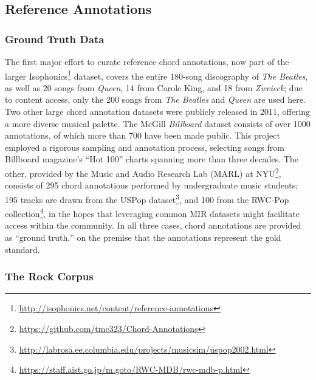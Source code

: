 \documentclass{article}
\begin{document}
\subsection{Reference Annotations}
\label{subsec:data}



\subsubsection{Ground Truth Data}
\label{subsubsec:ground_truth}

The first major effort to curate reference chord annotations, now part of the larger Isophonics\footnote{\url{http://isophonics.net/content/reference-annotations}} dataset, covers the entire 180-song discography of \emph{The Beatles}, as well as 20 songs from \emph{Queen}, 14 from Carole King, and 18 from \emph{Zweieck};
due to content access, only the 200 songs from \emph{The Beatles} and \emph{Queen} are used here.
Two other large chord annotation datasets were publicly released in 2011, offering a more diverse musical palette.
The McGill \emph{Billboard} dataset consists of over 1000 annotations, of which more than 700 have been made public.
This project employed a rigorous sampling and annotation process, selecting songs from Billboard magazine's ``Hot 100'' charts spanning more than three decades.
The other, provided by the Music and Audio Research Lab (MARL) at NYU\footnote{\url{https://github.com/tmc323/Chord-Annotations}}, consists of 295 chord annotations performed by undergraduate music students;
195 tracks are drawn from the USPop dataset\footnote{\url{http://labrosa.ee.columbia.edu/projects/musicsim/uspop2002.html}}, and 100 from the RWC-Pop collection\footnote{\url{https://staff.aist.go.jp/m.goto/RWC-MDB/rwc-mdb-p.html}}, in the hopes that leveraging common MIR datasets might facilitate access within the community.
In all three cases, chord annotations are provided as ``ground truth,'' on the premise that the annotations represent the gold standard.


\subsubsection{The Rock Corpus}
\end{document}
